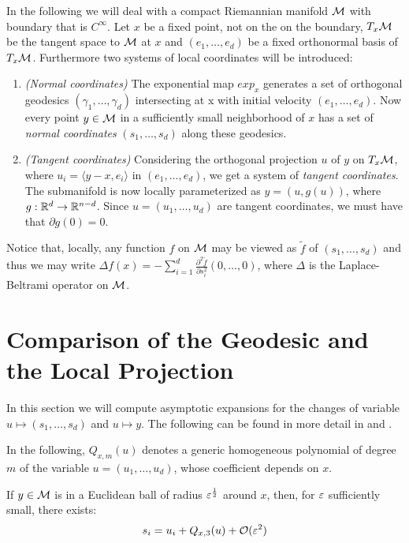 In the following we will deal with a compact Riemannian manifold $\mathcal{M}$ with boundary that is $C^\infty$. Let $x$ be a fixed point, not on the on the boundary, $T_x\mathcal{M}$ be the tangent space to $\mathcal{M}$ at $x$ and $(e_1,\dots,e_d)$ be a fixed orthonormal basis of $T_x\mathcal{M}$. Furthermore two systems of local coordinates will be introduced:
\begin{enumerate}
\item \textit{(Normal coordinates)} The exponential map $exp_x$ generates a set of orthogonal geodesics $(\gamma_1,\dots,\gamma_d)$ intersecting at x with initial velocity $(e_1,\dots,e_d)$. Now every point $y\in\mathcal{M}$ in a sufficiently small neighborhood of $x$ has a set of \textit{normal coordinates} $(s_1,\dots,s_d)$ along these geodesics.
\item \textit{(Tangent coordinates)} Considering the orthogonal projection $u$ of $y$ on $T_x\mathcal{M}$, where $u_i = \langle y-x,e_i\rangle$ in $(e_1,\dots,e_d)$, we get a system of \textit{tangent coordinates}. The submanifold is now locally parameterized as $y=(u,g(u))$, where $g:\mathbb{R}^d \rightarrow \mathbb{R}^{n-d}$. Since $u=(u_1,\dots,u_d)$ are tangent coordinates, we must have that $\partial g(0)=0$.
\end{enumerate}
Notice that, locally, any function $f$ on $\mathcal{M}$ may be viewed as $\tilde{f}$ of $(s_1,\dots,s_d)$ and thus we may write $\Delta f(x)=-\sum_{i=1}^d \frac{\partial^2\tilde{f}}{\partial s_i^2}(0,\dots,0)$, where $\Delta$ is the Laplace-Beltrami operator on $\mathcal{M}$.



\section{Comparison of the Geodesic and the Local Projection}
In this section we will compute asymptotic expansions for the changes of variable $u\mapsto (s_1,\dots,s_d)$ and $u\mapsto y$. The following can be found in more detail in \cite{Coifman20065} and \cite{Nadler2006113}.

In the following, $Q_{x,m}(u)$ denotes a generic homogeneous polynomial of degree $m$ of the variable $u = (u_1,\dots,u_d)$, whose coefficient depends on $x$.

\begin{lemma}
If $y\in\mathcal{M}$ is in a Euclidean ball of radius $\varepsilon^\frac{1}{2}$ around $x$, then, for $\varepsilon$ sufficiently small, there exists:
\begin{equation}\label{eq:geodOrder3}
s_i=u_i+Q_{x,3}(u)+\mathcal{O}(\varepsilon^2)
\end{equation}
\end{lemma}

